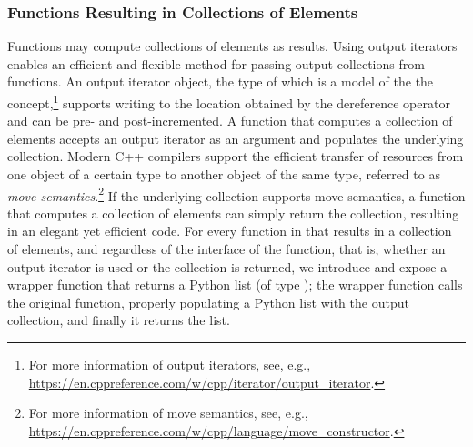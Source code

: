 \subsubsection{Functions Resulting in Collections of Elements}
\label{sec:code:output}
Functions may compute collections of elements as results. Using output
iterators enables an efficient and flexible method for passing output
collections from functions. An output iterator object, the type of
which is a model of the the 
concept,\footnote{For more information of output iterators, see, e.g.,
  \url{https://en.cppreference.com/w/cpp/iterator/output_iterator}.}
supports writing to the location obtained by the dereference operator
and can be pre- and post-incremented. A function that computes a
collection of elements accepts an output iterator as an argument and
populates the underlying collection. Modern C++ compilers support the
efficient transfer of resources from one object of a certain type to
another object of the same type, referred to as \emph{move
  semantics}.\footnote{For more information of move semantics, see,
  e.g.,
  \url{https://en.cppreference.com/w/cpp/language/move_constructor}.}
If the underlying collection supports move semantics, a function that
computes a collection of elements can simply return the collection,
resulting in an elegant yet efficient code. For every function in
\cgal{} that results in a collection of elements, and regardless of
the interface of the function, that is, whether an output iterator is
used or the collection is returned, we introduce and expose a wrapper
function that returns a Python list (of type );
the wrapper function calls the original function, properly populating
a Python list with the output collection, and finally it returns the
list.

